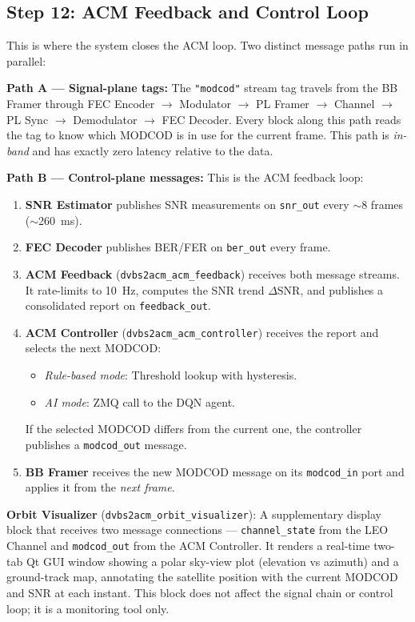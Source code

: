 \documentclass[12pt,a4paper]{report}
\begin{document}
\subsection{Step 12: ACM Feedback and Control Loop}

This is where the system closes the ACM loop. Two distinct message paths run
in parallel:

\textbf{Path A --- Signal-plane tags:} The \texttt{"modcod"} stream tag travels
from the BB Framer through FEC Encoder $\to$ Modulator $\to$ PL Framer $\to$
Channel $\to$ PL Sync $\to$ Demodulator $\to$ FEC Decoder. Every block along
this path reads the tag to know which MODCOD is in use for the current frame.
This path is \emph{in-band} and has exactly zero latency relative to the data.

\textbf{Path B --- Control-plane messages:} This is the ACM feedback loop:

\begin{enumerate}
    \item \textbf{SNR Estimator} publishes SNR measurements on \texttt{snr\_out}
          every $\sim$8 frames ($\sim$260~ms).
    \item \textbf{FEC Decoder} publishes BER/FER on \texttt{ber\_out} every frame.
    \item \textbf{ACM Feedback} (\texttt{dvbs2acm\_acm\_feedback}) receives both
          message streams. It rate-limits to 10~Hz, computes the SNR trend
          $\Delta\text{SNR}$, and publishes a consolidated report on
          \texttt{feedback\_out}.
    \item \textbf{ACM Controller} (\texttt{dvbs2acm\_acm\_controller}) receives
          the report and selects the next MODCOD:
          \begin{itemize}[nosep]
              \item \emph{Rule-based mode}: Threshold lookup with hysteresis.
              \item \emph{AI mode}: ZMQ call to the DQN agent.
          \end{itemize}
          If the selected MODCOD differs from the current one, the controller
          publishes a \texttt{modcod\_out} message.
    \item \textbf{BB Framer} receives the new MODCOD message on its
          \texttt{modcod\_in} port and applies it from the \emph{next frame}.
\end{enumerate}

\textbf{Orbit Visualizer} (\texttt{dvbs2acm\_orbit\_visualizer}): A
supplementary display block that receives two message connections ---
\texttt{channel\_state} from the LEO Channel and \texttt{modcod\_out} from
the ACM Controller.  It renders a real-time two-tab Qt GUI window showing a
polar sky-view plot (elevation vs azimuth) and a ground-track map, annotating
the satellite position with the current MODCOD and SNR at each instant.  This
block does not affect the signal chain or control loop; it is a monitoring
tool only.
\end{document}
